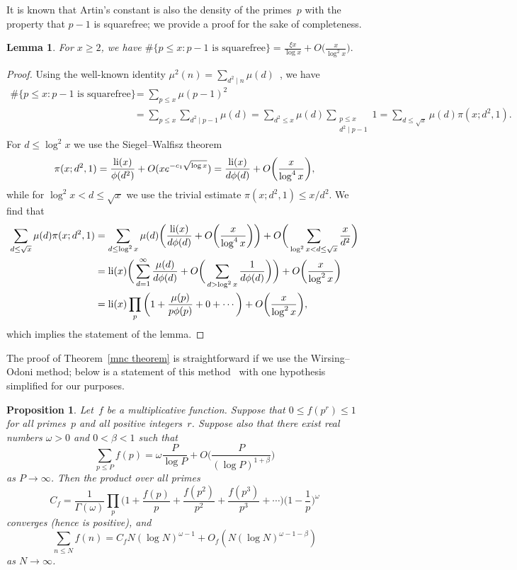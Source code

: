 \documentclass[12pt,reqno]{amsart}
\newtheorem{lemma}[theorem]{Lemma}
\newtheorem{proposition}[theorem]{Proposition}
\theoremstyle{definition}
\newcommand{\li}{\mathop{\rm li}}
\begin{document}
It is known that Artin's constant is also the density of the primes~$p$ with the property that $p-1$ is squarefree; we provide a proof for the sake of completeness.

\begin{lemma}\label{sfsum}
For $x\ge2$, we have
$\displaystyle
\#\{p\le x\colon p-1 \text{ is squarefree}\} = \frac{\xi x}{\log x}  + O\bigg( \frac {x}{\log^2 x}\bigg).
$
\end{lemma}

\begin{proof}
Using the well-known identity $\mu^2(n)=\sum_{d^2\mid n}\mu(d)$~\cite[equation~(2.4)]{MV}, we have
\begin{align*}
\#\{p\le x\colon p-1 \text{ is squarefree}\} &= \sum_{p\le x}\mu(p-1)^2 \\
&= \sum_{p\le x}\sum_{d^2\mid p-1}\mu(d) = \sum_{d^2\le x}\mu(d)\sum_{\substack{p\le x\\d^2\mid p-1}}1 = \sum_{d\le \sqrt{x}}\mu(d)\pi(x;d^2,1).
\end{align*}
For $d\le \log^2 x$ we use the Siegel--Walfisz theorem~\cite[Corollary~11.21]{MV}
\[
\pi(x;d^2,1)=\frac{\li(x)}{\phi(d^2)}+O(xe^{-c_1\sqrt{\log x}}) = \frac{\li(x)}{d\phi(d)} + O\bigg( \frac x{\log^4x} \bigg),
\]
while for $\log^2x < d \le \sqrt x$ we use the trivial estimate $\pi(x;d^2,1)\le x/d^2$. We find that
\begin{align*}
\sum_{d\le \sqrt{x}}\mu(d)\pi(x;d^2,1) &= \sum_{d\le\log^2x} \mu(d) \bigg( \frac{\li(x)}{d\phi(d)} + O\bigg( \frac x{\log^4x} \bigg) \bigg) + O\bigg( \sum_{\log^2x<d\le\sqrt x} \frac x{d^2} \bigg) \\
&= \li(x) \bigg( \sum_{d=1}^\infty \frac{\mu(d)}{d\phi(d)} + O\bigg( \sum_{d>\log^2x} \frac1{d\phi(d)} \bigg) \bigg) + O\bigg( \frac x{\log^2x} \bigg) \\
&= \li(x) \prod_p \bigg( 1 + \frac{\mu(p)}{p\phi(p)} + 0 + \cdots\bigg) + O\bigg( \frac x{\log^2x} \bigg),
\end{align*}
which implies the statement of the lemma.
\end{proof}

The proof of Theorem~\ref{mnc theorem} is straightforward if we use the Wirsing--Odoni method; below is a statement of this method~\cite[Proposition~4]{FinchMartinSebah} with one hypothesis simplified for our purposes.

\begin{proposition} \label{WOmethod}
Let~$f$ be a multiplicative function. Suppose that $0\le f(p^r)\le 1$ for all primes~$p$ and all positive integers~$r$. Suppose also that there exist real numbers $\omega>0$ and $0<\beta<1$ such that 
\[
\sum_{p\le P}f(p)=\omega\frac P{\log{P}}+O\bigg( \frac P{(\log{P})^{1+\beta}}\bigg)
\]
as $P\to\infty$. Then the product over all primes 
\[
C_f=\frac 1{\Gamma(\omega)}\prod_p\bigg(1+\frac{f(p)}p+\frac{f(p^2)}{p^2}+\frac{f(p^3)}{p^3}+\cdots\bigg) \bigg(1-\frac 1p\bigg)^\omega
\]
converges (hence is positive), and 
\[
\sum_{n\le N}f(n)=C_fN(\log{N})^{\omega-1}+O_f(N(\log{N})^{\omega-1-\beta})
\]
as $N\to\infty$.
\end{proposition}
\end{document}
